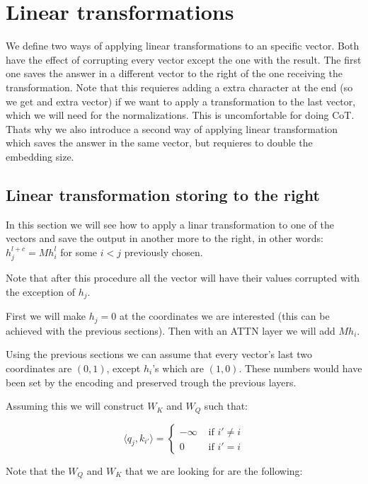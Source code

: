 \section*{Linear transformations}

We define two ways of applying linear transformations to an specific vector. Both have the effect of corrupting every vector except the one with the result. The first one saves the answer in a different vector to the right of the one receiving the transformation. Note that this requieres adding a extra character at the end (so we get and extra vector) if we want to apply a transformation to the last vector, which we will need for the normalizations. This is uncomfortable for doing CoT. Thats why we also introduce a second way of applying linear transformation which saves the answer in the same vector, but requieres to double the embedding size.

\subsection*{Linear transformation storing to the right}

In this section we will see how to apply a linar transformation to one of the vectors and save the output in another more to the right, in other words: $h_j^{l+c} = M h_i^l$ for some $i < j$ previously chosen.

Note that after this procedure all the vector will have their values corrupted with the exception of $h_j$. 

\bigskip

First we will make $h_j = 0$ at the coordinates we are interested (this can be achieved with the previous sections). Then with an ATTN layer we will add $M h_i$.

Using the previous sections we can assume that every vector's last two coordinates are $(0,1)$, except $h_i$'s which are $(1,0)$. These numbers would have been set by the encoding and preserved trough the previous layers.

Assuming this we will construct $W_K$ and $W_Q$ such that:

\[
\langle q_{j}, k_{i'} \rangle = \begin{cases}
    -\infty &\text{ if } i' \neq i \\
    0  &\text{ if } i' = i 
\end{cases}
\]

Note that the $W_Q$ and $W_K$ that we are looking for are the following:

